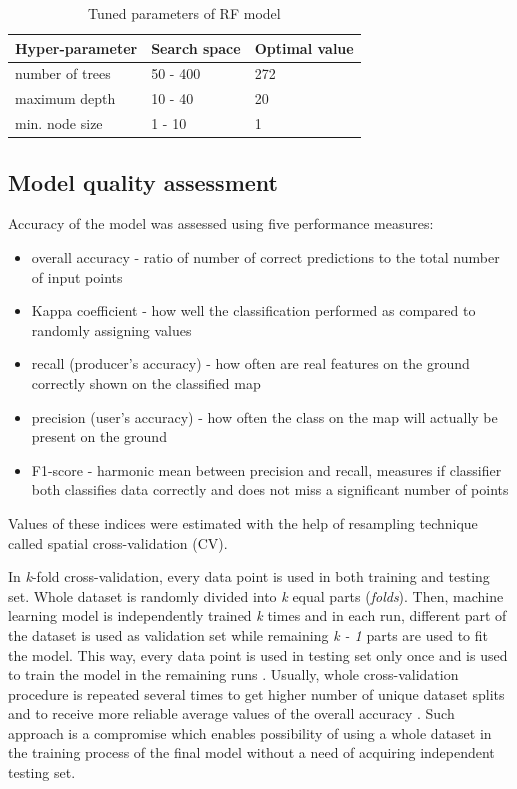 \documentclass{amuthesis}
\begin{document}
\hypertarget{tbl-tabela3}{}
\begin{table}
\caption{\label{tbl-tabela3}Tuned parameters of RF model }\tabularnewline

\centering
\begin{tabular}{|>{}l|>{}l|>{}l|}
\toprule
\textbf{Hyper-parameter} & \textbf{Search space} & \textbf{Optimal value}\\
\midrule
number of trees & 50 - 400 & 272\\
\hline
maximum depth & 10 - 40 & 20\\
\hline
min. node size & 1 - 10 & 1\\
\bottomrule
\end{tabular}
\end{table}

\hypertarget{sec-resampling}{%
\subsection{Model quality assessment}\label{sec-resampling}}

Accuracy of the model was assessed using five performance measures:

\begin{itemize}
\item
  overall accuracy - ratio of number of correct predictions to the total
  number of input points
\item
  Kappa coefficient - how well the classification performed as compared
  to randomly assigning values
\item
  recall (producer's accuracy) - how often are real features on the
  ground correctly shown on the classified map
\item
  precision (user's accuracy) - how often the class on the map will
  actually be present on the ground
\item
  F1-score - harmonic mean between precision and recall, measures if
  classifier both classifies data correctly and does not miss a
  significant number of points
\end{itemize}

Values of these indices were estimated with the help of resampling
technique called spatial cross-validation (CV).

In \emph{k}-fold cross-validation, every data point is used in both
training and testing set. Whole dataset is randomly divided into
\emph{k} equal parts (\emph{folds}). Then, machine learning model is
independently trained \emph{k} times and in each run, different part of
the dataset is used as validation set while remaining \emph{k - 1} parts
are used to fit the model. This way, every data point is used in testing
set only once and is used to train the model in the remaining runs
\autocite{jiao_performance_2016}. Usually, whole cross-validation
procedure is repeated several times to get higher number of unique
dataset splits and to receive more reliable average values of the
overall accuracy \autocite{varga_validation_2021}. Such approach is a
compromise which enables possibility of using a whole dataset in the
training process of the final model without a need of acquiring
independent testing set.
\end{document}
